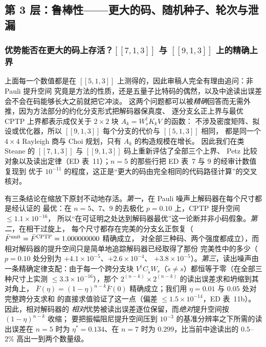 \documentclass[11pt,a4paper]{article}
\begin{document}
\subsection*{第 3 层：鲁棒性——更大的码、随机种子、轮次与泄漏}

\subsubsection*{优势能否在更大的码上存活？$[\![7,1,3]\!]$ 与 $[\![9,1,3]\!]$ 上的精确上界}

上面每一个数值都是在 $[\![5,1,3]\!]$ 上测得的，因此审稿人完全有理由追问：非 Pauli 提升空间
究竟是方法的性质，还是五量子比特码的偶然，以及中途读出误差会不会在码能够长大之前就把它冲淡。
这两个问题都可以被\emph{精确}回答而无需外推，因为方法部分的约化分支形式把解码器保真度、
逐分支幺正上界与最优 CPTP 上界都表示成仅关于 $2\times2$ 块 $A_k=W_s^\dagger K_kV$ 的函数：
不涉及密度矩阵、拟设或优化器，所以 $[\![9,1,3]\!]$ 每个分支的代价与 $[\![5,1,3]\!]$ 相同，
都是同一个 $4\times4$ Rayleigh 商与 Choi 规划，只有 $A_k$ 的构造规模在增长。
因此我们在类 Steane 的 $[\![7,1,3]\!]$ 与 $[\![9,1,3]\!]$ 码上重新评估了全部三个上界、
Petz 比较对象以及读出定律（ED 表~11）；$n=5$ 的那些行把 ED 表~7 与 9 的经审计数值复现到
优于 $10^{-11}$ 的程度，这正是“更大的码由完全相同的代码路径计算”的交叉核对。

有三条结论在缩放下原封不动地存活。\emph{第一}，在 Pauli 噪声上解码器在每个尺寸都是经认证的
最优：在 $n=5$、$7$、$9$ 的去极化 $p=0.10$ 上，CPTP 提升空间 $\le1.1\times10^{-16}$，
所以“在可证明之处达到解码器最优”这一论断并非小码假象。\emph{第二}，在相干过旋上，
每个尺寸都存在完美的分支幺正恢复（$\bar F^{\rm unit}=\bar F^{\rm CPTP}=1.000000000$ 精确成立，
对全部三种码、两个强度都成立），而相对解码器的提升空间只是简单地追踪解码器已经取得了那份
完美性中的多少（$p=0.10$ 处分别为 $+4.1\times10^{-5}$、$+2.6\times10^{-4}$、
$+3.8\times10^{-5}$）。\emph{第三}，读出噪声由一条精确定律支配：由于每一个跨分支块
$V^\dagger C_{\tilde s}W_s$（$\tilde s\neq s$）都恒等于零（在全部三种尺寸上实测
$\le3.3\times10^{-16}$），那个 $2^{(n-k)}\!\times\!2^{(n-k)}$ 的读出误差求和坍缩到其对角上，
$\bar F(\eta)=(1-\eta)^{n-k}\bar F(0)$ 精确成立；我们用 $\eta=0.01$ 与 $0.05$ 处对完整跨分支求和
的直接求值验证了这一点（偏差 $\le1.5\times10^{-14}$，ED 表~11b）。因此，相对解码器的
\emph{相对}优势被读出误差逐位保留，而\emph{绝对}提升空间按 $(1-\eta)^{n-k}$ 收缩；
要把振幅阻尼提升空间压到 $10^{-3}$ 的基准分辨率之下所需的读出误差在 $n=5$ 时为
$\eta^\ast=0.134$、在 $n=7$ 时为 $0.299$，比当前中途读出的 $0.5$--$2\%$ 高出一到两个数量级。
\end{document}
